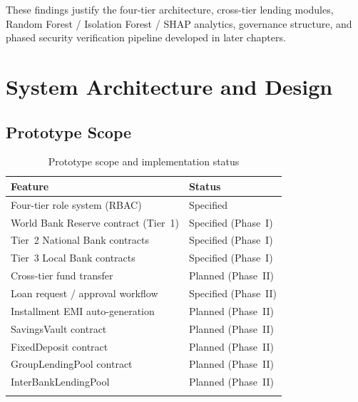 \documentclass[12pt, a4paper]{report}
\newcommand{\tmarkPartial}{\faHourglassHalf}
\newcommand{\tmarkPlanned}{\textcolor{black!55}{\faCircle}}
\newcommand{\tableheadcolor}{\rowcolor{TableHeadBg}}
\newcommand{\tableheadfont}{\bfseries}
\begin{document}
These findings justify the four-tier architecture, cross-tier lending modules, Random Forest / Isolation Forest / SHAP analytics, governance structure, and phased security verification pipeline developed in later chapters.

\chapter{System Architecture and Design}

\section{Prototype Scope}
\label{sec:prototype-scope}

\begin{table}[H]
\centering
\caption[Prototype scope and implementation status]{Prototype scope and implementation status}
\label{tab:prototype-scope}
\footnotesize
\renewcommand{\arraystretch}{0.88}
\setlength{\tabcolsep}{3pt}
\begin{tabular}{@{}p{7.1cm}>{\raggedleft\arraybackslash}p{5.9cm}@{}}
\toprule
\tableheadcolor
\tableheadfont Feature & \tableheadfont Status \\
\midrule
Four-tier role system (RBAC) & \tmarkPartial{} Specified \\
\rowcolor{RowShade}
World Bank Reserve contract (Tier~1) & \tmarkPartial{} Specified (Phase~I) \\
Tier~2 National Bank contracts & \tmarkPartial{} Specified (Phase~I) \\
\rowcolor{RowShade}
Tier~3 Local Bank contracts & \tmarkPartial{} Specified (Phase~I) \\
Cross-tier fund transfer & \tmarkPlanned{} Planned (Phase~II) \\
\rowcolor{RowShade}
Loan request / approval workflow & \tmarkPartial{} Specified (Phase~II) \\
Installment EMI auto-generation & \tmarkPlanned{} Planned (Phase~II) \\
\rowcolor{RowShade}
SavingsVault contract & \tmarkPlanned{} Planned (Phase~II) \\
FixedDeposit contract & \tmarkPlanned{} Planned (Phase~II) \\
\rowcolor{RowShade}
GroupLendingPool contract & \tmarkPlanned{} Planned (Phase~II) \\
InterBankLendingPool & \tmarkPlanned{} Planned (Phase~II) \\
\rowcolor{RowShade}

\end{tabular}
\end{table}
\end{document}
